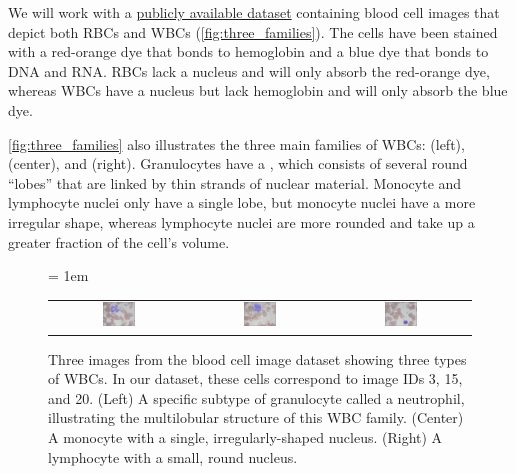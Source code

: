 We will work with a \href{https://github.com/Shenggan/BCCD_Dataset}{publicly available dataset} containing blood cell images that depict both RBCs and WBCs (\autoref{fig:three_families}). The cells have been stained with a red-orange dye that bonds to hemoglobin and a blue dye that bonds to DNA and RNA. RBCs lack a nucleus and will only absorb the red-orange dye, whereas WBCs have a nucleus but lack hemoglobin and will only absorb the blue dye.

\autoref{fig:three_families} also illustrates the three main families of WBCs:  (left),  (center), and  (right).  Granulocytes have a , which consists of several round ``lobes'' that are linked by thin strands of nuclear material. Monocyte and lymphocyte nuclei only have a single lobe, but monocyte nuclei have a more irregular shape, whereas lymphocyte nuclei are more rounded and take up a greater fraction of the cell's volume.\\

\begin{figure}[h]
\centering
\tabcolsep = 1em
\mySfFamily
\begin{tabular}{c c c}
\includegraphics[width = 0.25\textwidth]{../images/neutrophil.png} & \includegraphics[width = 0.25\textwidth]{../images/monocyte.png} & \includegraphics[width = 0.25\textwidth]{../images/lymphocyte.png}
\end{tabular}
\caption{Three images from the blood cell image dataset showing three types of WBCs. In our dataset, these cells correspond to image IDs 3, 15, and 20. (Left) A specific subtype of granulocyte called a neutrophil, illustrating the multilobular structure of this WBC family. (Center) A monocyte with a single, irregularly-shaped nucleus. (Right) A lymphocyte with a small, round nucleus.}
\label{fig:three_families}
\end{figure}


